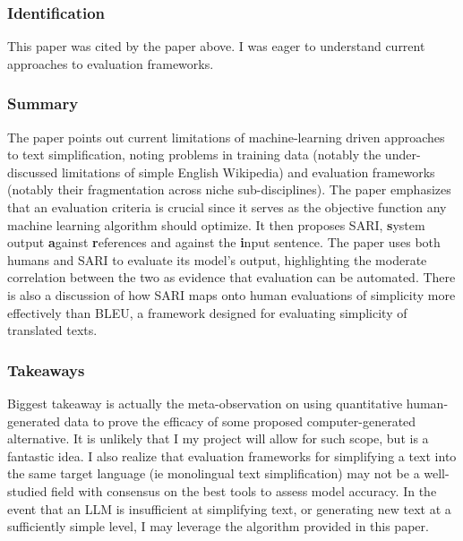 \documentclass[
	letterpaper, %
]{jdf}
\begin{document}
\subsubsection{Identification}
This paper was cited by the paper above. I was eager to understand current approaches to evaluation frameworks.

\subsubsection{Summary}
The paper points out current limitations of machine-learning driven approaches to text simplification, noting problems in training data (notably the under-discussed limitations of simple English Wikipedia) and evaluation frameworks (notably their fragmentation across niche sub-disciplines). The paper emphasizes that an evaluation criteria is crucial since it serves as the objective function any machine learning algorithm should optimize. It then proposes SARI, \textbf{s}ystem output \textbf{a}gainst \textbf{r}eferences and against the \textbf{i}nput sentence. The paper uses both humans and SARI to evaluate its model's output, highlighting the moderate correlation between the two as evidence that evaluation can be automated. There is also a discussion of how SARI maps onto human evaluations of simplicity more effectively than BLEU, a framework designed for evaluating simplicity of translated texts.

\subsubsection{Takeaways}
Biggest takeaway is actually the meta-observation on using quantitative human-generated data to prove the efficacy of some proposed computer-generated alternative. It is unlikely that I my project will allow for such scope, but is a fantastic idea. I also realize that evaluation frameworks for simplifying a text into the same target language (ie monolingual text simplification) may not be a well-studied field with consensus on the best tools to assess model accuracy. In the event that an LLM is insufficient at simplifying text, or generating new text at a sufficiently simple level, I may leverage the algorithm provided in this paper.
%
\subsection{}
\end{document}
